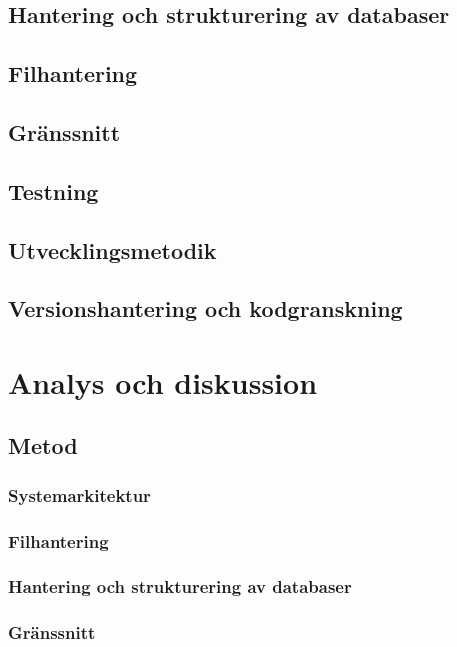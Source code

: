 \documentclass[a4paper,12pt,oneside,final]{extbook}
\begin{document}
\section{Hantering och strukturering av databaser}

\section{Filhantering}

\section{Gränssnitt}

\section{Testning}

\section{Utvecklingsmetodik}

\section{Versionshantering och kodgranskning}

\chapter{Analys och diskussion}

\section{Metod}

\subsection{Systemarkitektur}

\subsection{Filhantering}

\subsection{Hantering och strukturering av databaser}

\subsection{Gränssnitt}
\end{document}
